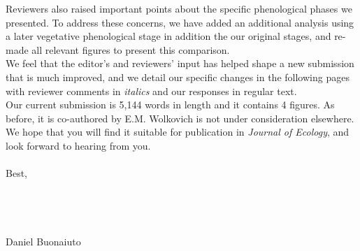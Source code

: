 \documentclass[11.75 pt]{article}\usepackage[]{graphicx}\usepackage[]{color}
\begin{document}
\noindent Reviewers also raised important points about the specific phenological phases we presented. To address these concerns, we have added an additional analysis using a later vegetative phenological stage in addition the our original stages, and re-made all relevant figures to present this comparison.\\

\noindent We feel that the editor's and reviewers' input has helped shape a new submission that is much improved, and we detail our specific changes in the following pages with reviewer comments in \emph{italics} and our responses in regular text.\\

\noindent Our current submission is 5,144 words in length and it contains 4 figures. As before, it is co-authored by E.M. Wolkovich is not under consideration elsewhere. We hope that you will find it suitable for publication in \textit{Journal of Ecology}, and look forward to hearing from you.\\\\ 


\noindent Best,\\
\\\\\\\\



\noindent Daniel Buonaiuto
\end{document}
